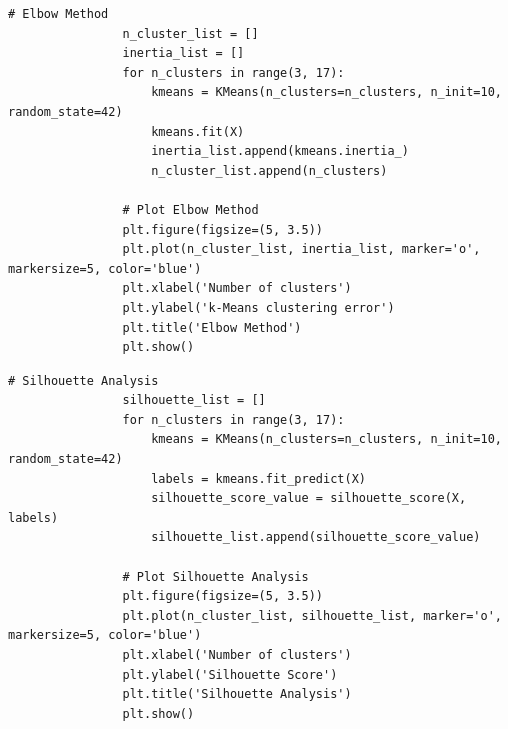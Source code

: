             \begin{lstlisting}[caption={Elbow Method for k-Means Clustering}, label={lst:elbow_method}]
                # Elbow Method
                n_cluster_list = []
                inertia_list = []
                for n_clusters in range(3, 17):
                    kmeans = KMeans(n_clusters=n_clusters, n_init=10, random_state=42)
                    kmeans.fit(X)
                    inertia_list.append(kmeans.inertia_)
                    n_cluster_list.append(n_clusters)
                
                # Plot Elbow Method
                plt.figure(figsize=(5, 3.5))
                plt.plot(n_cluster_list, inertia_list, marker='o', markersize=5, color='blue')
                plt.xlabel('Number of clusters')
                plt.ylabel('k-Means clustering error')
                plt.title('Elbow Method')
                plt.show()
            \end{lstlisting}
            
            \vspace{0.5em}

            \begin{lstlisting}[caption={Silhouette Analysis for k-Means Clustering}, label={lst:silhouette_analysis}]
                # Silhouette Analysis
                silhouette_list = []
                for n_clusters in range(3, 17):
                    kmeans = KMeans(n_clusters=n_clusters, n_init=10, random_state=42)
                    labels = kmeans.fit_predict(X)
                    silhouette_score_value = silhouette_score(X, labels)
                    silhouette_list.append(silhouette_score_value)
                
                # Plot Silhouette Analysis
                plt.figure(figsize=(5, 3.5))
                plt.plot(n_cluster_list, silhouette_list, marker='o', markersize=5, color='blue')
                plt.xlabel('Number of clusters')
                plt.ylabel('Silhouette Score')
                plt.title('Silhouette Analysis')
                plt.show()
            \end{lstlisting}
            
            \vspace{0.5em}

